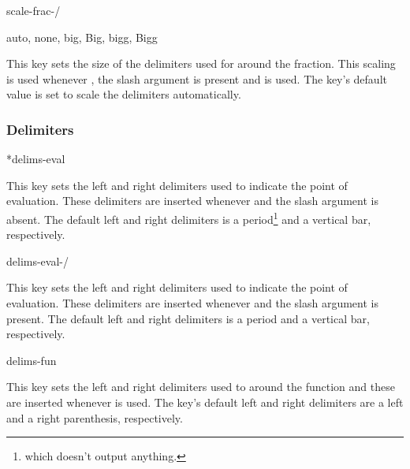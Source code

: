 \documentclass[final,british,10pt]{scrartcl}
\theoremstyle{remark}
\begin{document}
	\begin{option}{scale-frac-/}
		\begin{values}[default = auto]
			auto, none, big, Big, bigg, Bigg
		\end{values}
		This key sets the size of the delimiters used for around the fraction. This scaling is used whenever , the slash argument is present and  is used. The key's default value is set to scale the delimiters automatically.
	\end{option}
	
	\subsubsection*{Delimiters}
	
	\begin{option}*{delims-eval}
		\begin{values}[default = .~\cs{rvert}]
		\end{values}
		This key sets the left and right delimiters used to indicate the point of evaluation. These delimiters are inserted whenever  and the slash argument is absent. The default left and right delimiters is a period\footnote{which doesn't output anything.\label{foot:period_no_output}} and a vertical bar, respectively.
	\end{option}
	
	\begin{option}{delims-eval-/}
		\begin{values}[default = .~\cs{rvert}]
		\end{values}
		This key sets the left and right delimiters used to indicate the point of evaluation. These delimiters are inserted whenever  and the slash argument is present. The default left and right delimiters is a period and a vertical bar, respectively.
	\end{option}
	
	\begin{option}{delims-fun}
		\begin{values}[default = (~)]
		\end{values}
		This key sets the left and right delimiters used to around the function and these are inserted whenever  is used. The key's default left and right delimiters are a left and a right parenthesis, respectively.
	\end{option}
	
\end{document}
